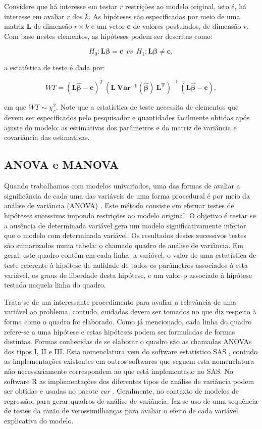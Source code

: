 Considere que há interesse em testar $r$ restrições ao modelo original, isto é, há interesse em avaliar $r$ dos $k$. As hipóteses são especificadas por meio de uma matriz $\boldsymbol{L}$ de dimensão $r \times k$ e um vetor $\boldsymbol{c}$ de valores postulados, de dimensão $r$. Com base nestes elementos, as hipóteses podem ser descritas como:

$$
H_0: \boldsymbol{L}\boldsymbol{\beta} = \boldsymbol{c} \: \:  vs \: \:  H_1: \boldsymbol{L}\boldsymbol{\beta} \neq \boldsymbol{c},
$$

\noindent a estatística de teste é dada por:

$$
WT = (\boldsymbol{L\hat\beta} - \boldsymbol{c})^T \ (\boldsymbol{L \ Var^{-1}(\hat\beta) \ L^T})^{-1} \ (\boldsymbol{L\hat\beta} - \boldsymbol{c}),
$$

\noindent em que $WT \sim \chi^2_r$. Note que a estatística de teste necessita de elementos que devem ser especificados pelo pesquisador e quantidades facilmente obtidas após ajuste do modelo: as estimativas dos parâmetros e da matriz de variância e covariância das estimativas.

\subsection{ANOVA e MANOVA}

Quando trabalhamos com modelos univariados, uma das formas de avaliar a significância de cada uma das variáveis de uma forma procedural é por meio da análise de variância (ANOVA) \citep{anova_fisher}. Este método consiste em efetuar testes de hipóteses sucessivos impondo restrições ao modelo original. O objetivo é testar se a ausência de determinada variável gera um modelo significativamente inferior que o modelo com determinada variável. Os resultados destes sucessivos testes são sumarizados numa tabela: o chamado quadro de análise de variância. Em geral, este quadro contém em cada linha: a variável, o valor de uma estatística de teste referente à hipótese de nulidade de todos os parâmetros associados à esta variável, os graus de liberdade desta hipótese, e um valor-p associado à hipótese testada naquela linha do quadro.

Trata-se de um interessante procedimento para avaliar a relevância de uma variável ao problema, contudo, cuidados devem ser tomados no que diz respeito à forma como o quadro foi elaborado. Como já mencionado, cada linha do quadro refere-se a uma hipótese e estas hipóteses podem ser formuladas de formas distintas. Formas conhecidas de se elaborar o quadro são as chamadas ANOVAs dos tipos I, II e III. Esta nomenclatura vem do software estatístico SAS \citep{sas}, contudo as implementações existentes em outros softwares que seguem esta nomenclatura não necessariamente correspondem ao que está implementado no SAS. No software R \citep{softwareR} as implementações dos diferentes tipos de análise de variância podem ser obtidas e usadas no pacote \emph{car} \citep{car}. Geralmente, no contexto de modelos de regressão, para gerar quadros de análise de variância, faz-se uso de uma sequência de testes da razão de verossimilhanças para avaliar o efeito de cada variável explicativa do modelo. 

